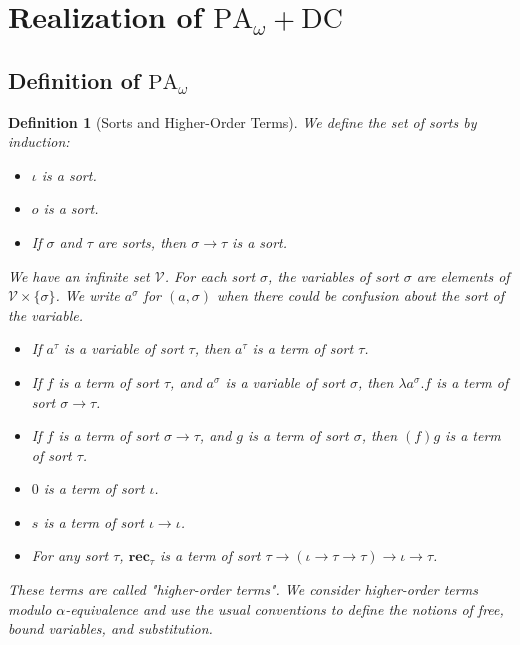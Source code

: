 \documentclass[a4paper,12pt]{article}
\newtheorem{defi}[theo]{Definition}
\theoremstyle{rmqstyle}
\newcommand{\set}[1]{\{#1\}}
\newcommand{\PA}{\mathrm{PA}}
\newcommand{\rec}{\mathbf{rec}}
\newcommand{\DC}{\mathrm{DC}}
\begin{document}
\clearpage

\section{Realization of \( \PA_\omega +  \DC\)}
\label{sec 2}

\subsection{Definition of \( \PA_\omega \)}

\begin{defi}[Sorts and Higher-Order Terms]
We define the set of sorts by induction:
\begin{itemize}
\setlength\itemsep{ -1 em}
\item $\iota$ is a sort.\\
\item $o$ is a sort.\\
\item If $\sigma$ and $\tau$ are sorts, then $\sigma \to \tau$ is a sort.
\end{itemize}
We have an infinite set $\mathcal{V}$. For each sort $\sigma$, the variables of sort $\sigma$ are elements of $\mathcal{V} \times \set{\sigma}$. We write $a^\sigma$ for $(a, \sigma)$ when there could be confusion about the sort of the variable.
\begin{itemize}
\setlength\itemsep{ -1 em}
\item If $a^\tau$ is a variable of sort $\tau$, then $a^\tau$ is a term of sort $\tau$.\\
\item If $f$ is a term of sort $\tau$, and $a^\sigma$ is a variable of sort $\sigma$, then $\lambda a^\sigma. f$ is a term of sort $\sigma \to \tau$.\\
\item If $f$ is a term of sort $\sigma \to \tau$, and $g$ is a term of sort $\sigma$, then $(f)g$ is a term of sort $\tau$.\\
\item $0$ is a term of sort $\iota$.\\
\item $s$ is a term of sort $\iota \to \iota$.\\
\item For any sort $\tau$, $\rec_\tau$ is a term of sort $\tau \to ( \iota \to \tau \to \tau) \to \iota \to \tau$.
\end{itemize}
These terms are called "higher-order terms". We consider higher-order terms modulo $\alpha$-equivalence and use the usual conventions to define the notions of free, bound variables, and substitution.
\end{defi}
\end{document}
